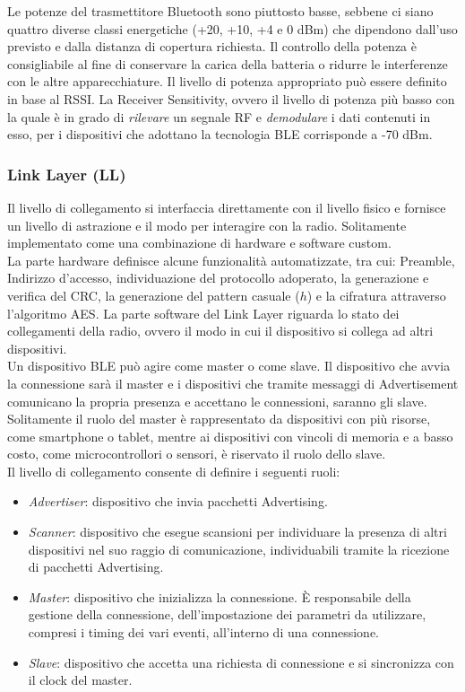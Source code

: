 \noindent Le potenze del trasmettitore Bluetooth sono piuttosto basse, sebbene ci siano quattro diverse classi energetiche (+20, +10, +4 e 0 dBm) che dipendono dall'uso previsto e dalla distanza di copertura richiesta. Il controllo della potenza è consigliabile al fine di conservare la carica della batteria o ridurre le interferenze con le altre apparecchiature. Il livello di potenza appropriato può essere definito in base al RSSI. La Receiver Sensitivity, ovvero il livello di potenza più basso con la quale è in grado di \textit{rilevare} un segnale RF e \textit{demodulare} i dati contenuti in esso, per i dispositivi che adottano la tecnologia BLE corrisponde a -70 dBm.

\subsubsection{Link Layer (LL)}
Il livello di collegamento si interfaccia direttamente con il livello fisico e fornisce un livello di astrazione e il modo per interagire con la radio. Solitamente implementato come una combinazione di hardware e software custom.\\
La parte hardware definisce alcune funzionalità automatizzate, tra cui: Preamble, Indirizzo d'accesso, individuazione del protocollo adoperato, la generazione e verifica del CRC, la generazione del pattern casuale ($h$) e la cifratura attraverso l'algoritmo AES.
La parte software del Link Layer riguarda lo stato dei collegamenti della radio, ovvero il modo in cui il dispositivo si collega ad altri dispositivi. \\
Un dispositivo BLE può agire come master o come slave. Il dispositivo che avvia la connessione sarà il master e i dispositivi che tramite messaggi di Advertisement comunicano la propria presenza e accettano le connessioni, saranno gli slave. 
Solitamente il ruolo del master è rappresentato da dispositivi con più risorse, come smartphone o tablet, mentre ai dispositivi con vincoli di memoria e a basso costo, come microcontrollori o sensori, è riservato il ruolo dello slave.\\

\noindent Il livello di collegamento consente di definire i seguenti ruoli:
\begin{itemize}
    \item \textit{Advertiser}: dispositivo che invia pacchetti Advertising.
    \item \textit{Scanner}: dispositivo che esegue scansioni per individuare la presenza di altri dispositivi nel suo raggio di comunicazione, individuabili tramite la ricezione di pacchetti Advertising.
    \item \textit{Master}: dispositivo che inizializza la connessione. \MakeUppercase{è} responsabile della gestione della connessione, dell'impostazione dei parametri da utilizzare, compresi i timing dei vari eventi, all'interno di una connessione.
    
    \item \textit{Slave}: dispositivo che accetta una richiesta di connessione e si sincronizza con il clock del master.
\end{itemize}

